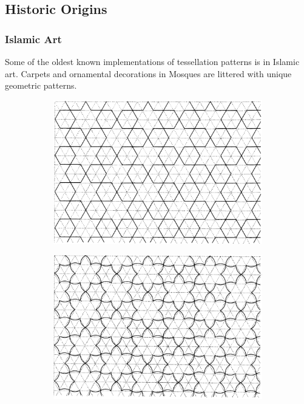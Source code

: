\documentclass[12pt,letterpaper]{article}
\begin{document}
\subsection{Historic Origins}
\subsubsection{Islamic Art}

Some of the oldest known implementations of tessellation patterns is in Islamic art. Carpets and ornamental decorations in Mosques are littered with unique geometric patterns. 

\begin{figure}[H]
    \begin{center}
        \label{fig:islam}
        \caption{Artistic tessellations in the style of traditional Islamic art.}
        \begin{subfigure}[b]{.3\linewidth}
            \includegraphics[width=\linewidth]{islam1}
        \end{subfigure}
        \begin{subfigure}[b]{.3\linewidth}
            \includegraphics[width=\linewidth]{islam2}

\end{subfigure}
\end{center}
\end{figure}
\end{document}
